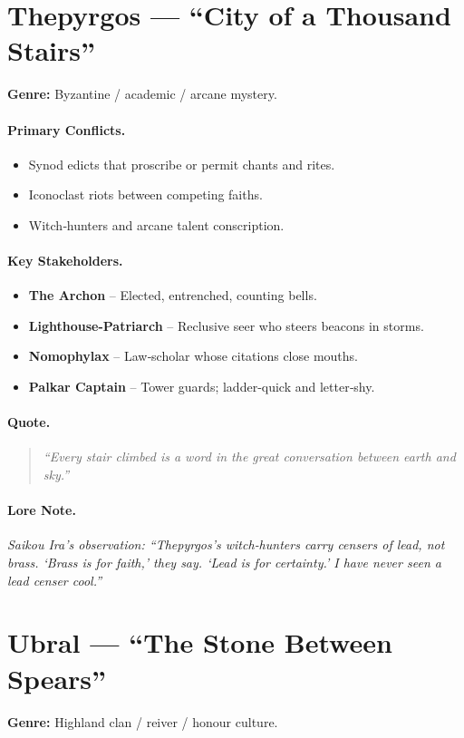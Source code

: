 \section{Thepyrgos — “City of a Thousand Stairs”}
\textbf{Genre:} Byzantine / academic / arcane mystery.

\paragraph{Primary Conflicts.}
\begin{itemize}
  \item Synod edicts that proscribe or permit chants and rites.
  \item Iconoclast riots between competing faiths.
  \item Witch‑hunters and arcane talent conscription.
\end{itemize}

\paragraph{Key Stakeholders.}
\begin{itemize}
  \item \textbf{The Archon} – Elected, entrenched, counting bells.
  \item \textbf{Lighthouse-Patriarch} – Reclusive seer who steers beacons in storms.
  \item \textbf{Nomophylax} – Law‑scholar whose citations close mouths.
  \item \textbf{Palkar Captain} – Tower guards; ladder‑quick and letter‑shy.
\end{itemize}

\paragraph{Quote.}
\begin{quote}
\emph{“Every stair climbed is a word in the great conversation between earth and sky.”}
\end{quote}

\paragraph{Lore Note.}
\emph{Saikou Ira’s observation: “Thepyrgos’s witch‑hunters carry censers of lead, not brass. ‘Brass is for faith,’ they say. ‘Lead is for certainty.’ I have never seen a lead censer cool.”}

\section{Ubral — “The Stone Between Spears”}
\textbf{Genre:} Highland clan / reiver / honour culture.

